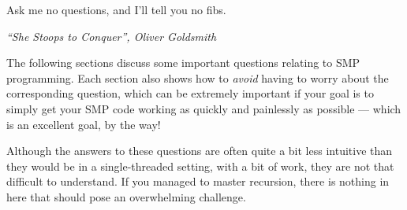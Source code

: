 

\epigraph{Ask me no questions, and I'll tell you no fibs.}
	 {\emph{``She Stoops to Conquer'', Oliver Goldsmith}}

The following sections discuss some important questions relating to
SMP programming.
Each section also shows how to {\em avoid} having to worry about
the corresponding question, which can be extremely important if
your goal is to simply get your SMP code working as quickly and
painlessly as possible --- which is an excellent goal, by the way!

Although the answers to these questions are often quite a bit less
intuitive than they would be in a single-threaded setting,
with a bit of work, they are not that difficult to understand.
If you managed to master recursion, there is nothing in here that should
pose an overwhelming challenge.







